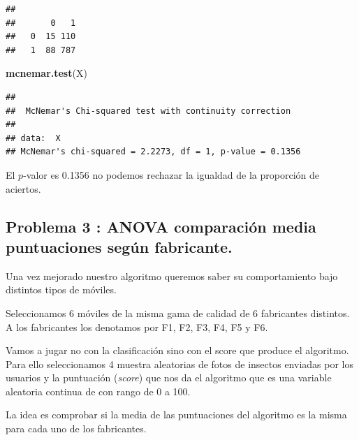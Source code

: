 \documentclass[
]{article}
\newenvironment{Shaded}{\begin{snugshade}}{\end{snugshade}}
\newcommand{\KeywordTok}[1]{\textcolor[rgb]{0.13,0.29,0.53}{\textbf{#1}}}
\newcommand{\NormalTok}[1]{#1}
\newcommand{\OperatorTok}[1]{\textcolor[rgb]{0.81,0.36,0.00}{\textbf{#1}}}
\begin{document}
\begin{Shaded}
\end{Shaded}

\begin{verbatim}
##    
##       0   1
##   0  15 110
##   1  88 787
\end{verbatim}

\begin{Shaded}
\begin{Highlighting}[]
\KeywordTok{mcnemar.test}\NormalTok{(X)}
\end{Highlighting}
\end{Shaded}

\begin{verbatim}
## 
##  McNemar's Chi-squared test with continuity correction
## 
## data:  X
## McNemar's chi-squared = 2.2273, df = 1, p-value = 0.1356
\end{verbatim}

El \(p\)-valor es 0.1356 no podemos rechazar la igualdad de la
proporción de aciertos.

\hypertarget{problema-3-anova-comparaciuxf3n-media-puntuaciones-seguxfan-fabricante.}{%
\subsection{Problema 3 : ANOVA comparación media puntuaciones según
fabricante.}\label{problema-3-anova-comparaciuxf3n-media-puntuaciones-seguxfan-fabricante.}}

Una vez mejorado nuestro algoritmo queremos saber su comportamiento bajo
distintos tipos de móviles.

Seleccionamos 6 móviles de la misma gama de calidad de 6 fabricantes
distintos. A los fabricantes los denotamos por F1, F2, F3, F4, F5 y F6.

Vamos a jugar no con la clasificación sino con el score que produce el
algoritmo. Para ello seleccionamos 4 muestra aleatorias de fotos de
insectos enviadas por los usuarios y la puntuación (\emph{score}) que
nos da el algoritmo que es una variable aleatoria continua de con rango
de 0 a 100.

La idea es comprobar si la media de las puntuaciones del algoritmo es la
misma para cada uno de los fabricantes.
\end{document}
